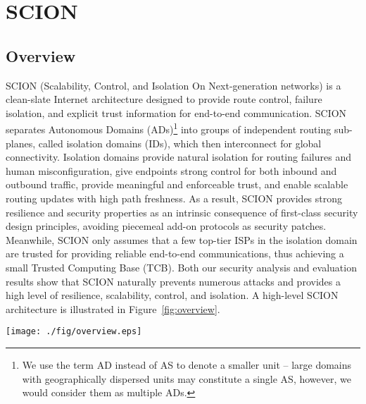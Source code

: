 \chapter{SCION}

\section{Overview}

SCION (Scalability, Control, and Isolation On Next-generation networks) is a
clean-slate Internet architecture designed to provide route control, failure
isolation, and explicit trust information for end-to-end communication. SCION
separates Autonomous Domains (ADs)\footnote{We use the term AD instead of AS to
  denote a smaller unit -- large domains with geographically dispersed units may
  constitute a single AS, however, we would consider them as multiple ADs.} into
groups of independent routing sub-planes, called isolation domains (IDs), which then
interconnect for global connectivity. Isolation domains provide natural isolation
for routing failures and human misconfiguration, give endpoints strong control
for both inbound and outbound traffic, provide meaningful and enforceable trust,
and enable scalable routing updates with high path freshness. As a result, SCION
provides strong resilience and security properties as an intrinsic consequence
of first-class security design principles, avoiding piecemeal add-on protocols
as security patches. Meanwhile, SCION only assumes that a few top-tier ISPs in
the isolation domain are trusted for providing reliable end-to-end communications,
thus achieving a small Trusted Computing Base (TCB). Both our security analysis
and evaluation results show that SCION naturally prevents numerous attacks and
provides a high level of resilience, scalability, control, and isolation. A
high-level SCION architecture is illustrated in Figure~\ref{fig:overview}.

\begin{figure*}[ht]
\centering
\texttt{[image: ./fig/overview.eps]}
\caption{SCION Architecture.}\label{fig:overview}
\end{figure*}

